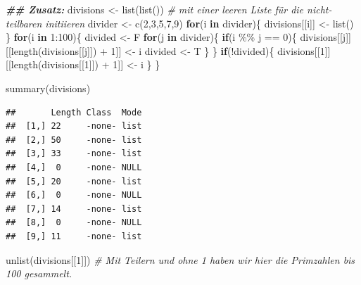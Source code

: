 \documentclass[
]{book}
\newenvironment{Shaded}{\begin{snugshade}}{\end{snugshade}}
\newcommand{\CommentTok}[1]{\textcolor[rgb]{0.56,0.35,0.01}{\textit{#1}}}
\newcommand{\ControlFlowTok}[1]{\textcolor[rgb]{0.13,0.29,0.53}{\textbf{#1}}}
\newcommand{\DecValTok}[1]{\textcolor[rgb]{0.00,0.00,0.81}{#1}}
\newcommand{\DocumentationTok}[1]{\textcolor[rgb]{0.56,0.35,0.01}{\textbf{\textit{#1}}}}
\newcommand{\FunctionTok}[1]{\textcolor[rgb]{0.00,0.00,0.00}{#1}}
\newcommand{\NormalTok}[1]{#1}
\newcommand{\OtherTok}[1]{\textcolor[rgb]{0.56,0.35,0.01}{#1}}
\newcommand{\SpecialCharTok}[1]{\textcolor[rgb]{0.00,0.00,0.00}{#1}}
\begin{document}
\begin{Shaded}
\begin{Highlighting}[]
\DocumentationTok{\#\# Zusatz:}
\NormalTok{divisions }\OtherTok{\textless{}{-}} \FunctionTok{list}\NormalTok{(}\FunctionTok{list}\NormalTok{()) }\CommentTok{\# mit einer leeren Liste für die nicht{-}teilbaren initiieren}
\NormalTok{divider }\OtherTok{\textless{}{-}} \FunctionTok{c}\NormalTok{(}\DecValTok{2}\NormalTok{,}\DecValTok{3}\NormalTok{,}\DecValTok{5}\NormalTok{,}\DecValTok{7}\NormalTok{,}\DecValTok{9}\NormalTok{)}
\ControlFlowTok{for}\NormalTok{(i }\ControlFlowTok{in}\NormalTok{ divider)\{}
\NormalTok{  divisions[[i]] }\OtherTok{\textless{}{-}} \FunctionTok{list}\NormalTok{()}
\NormalTok{\}}
\ControlFlowTok{for}\NormalTok{(i }\ControlFlowTok{in} \DecValTok{1}\SpecialCharTok{:}\DecValTok{100}\NormalTok{)\{}
\NormalTok{  divided }\OtherTok{\textless{}{-}}\NormalTok{  F}
  \ControlFlowTok{for}\NormalTok{(j }\ControlFlowTok{in}\NormalTok{ divider)\{}
    \ControlFlowTok{if}\NormalTok{(i }\SpecialCharTok{\%\%}\NormalTok{ j }\SpecialCharTok{==} \DecValTok{0}\NormalTok{)\{}
\NormalTok{      divisions[[j]][[}\FunctionTok{length}\NormalTok{(divisions[[j]]) }\SpecialCharTok{+} \DecValTok{1}\NormalTok{]] }\OtherTok{\textless{}{-}}\NormalTok{ i}
\NormalTok{      divided }\OtherTok{\textless{}{-}}\NormalTok{ T}
\NormalTok{    \}}
\NormalTok{  \}}
  \ControlFlowTok{if}\NormalTok{(}\SpecialCharTok{!}\NormalTok{divided)\{}
\NormalTok{    divisions[[}\DecValTok{1}\NormalTok{]][[}\FunctionTok{length}\NormalTok{(divisions[[}\DecValTok{1}\NormalTok{]]) }\SpecialCharTok{+} \DecValTok{1}\NormalTok{]] }\OtherTok{\textless{}{-}}\NormalTok{ i}
\NormalTok{  \}}
\NormalTok{\}}

\FunctionTok{summary}\NormalTok{(divisions)}
\end{Highlighting}
\end{Shaded}

\begin{verbatim}
##       Length Class  Mode
##  [1,] 22     -none- list
##  [2,] 50     -none- list
##  [3,] 33     -none- list
##  [4,]  0     -none- NULL
##  [5,] 20     -none- list
##  [6,]  0     -none- NULL
##  [7,] 14     -none- list
##  [8,]  0     -none- NULL
##  [9,] 11     -none- list
\end{verbatim}

\begin{Shaded}
\begin{Highlighting}[]
\FunctionTok{unlist}\NormalTok{(divisions[[}\DecValTok{1}\NormalTok{]]) }\CommentTok{\# Mit Teilern und ohne 1 haben wir hier die Primzahlen bis 100 gesammelt.}
\end{Highlighting}
\end{Shaded}
\end{document}
